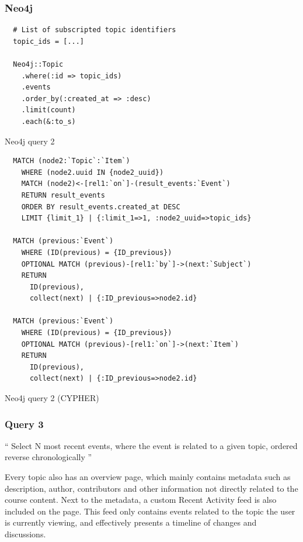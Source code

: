 \subsubsection*{Neo4j}

\begin{listing}[H]
  \begin{verbatim}
  # List of subscripted topic identifiers
  topic_ids = [...]

  Neo4j::Topic
    .where(:id => topic_ids)
    .events
    .order_by(:created_at => :desc)
    .limit(count)
    .each(&:to_s)
  \end{verbatim}

  \caption{Neo4j query 2}
  \label{lst:neo4j-query-2}
\end{listing}

\begin{listing}[H]
  \begin{verbatim}
  MATCH (node2:`Topic`:`Item`)
    WHERE (node2.uuid IN {node2_uuid})
    MATCH (node2)<-[rel1:`on`]-(result_events:`Event`)
    RETURN result_events
    ORDER BY result_events.created_at DESC
    LIMIT {limit_1} | {:limit_1=>1, :node2_uuid=>topic_ids}

  MATCH (previous:`Event`)
    WHERE (ID(previous) = {ID_previous})
    OPTIONAL MATCH (previous)-[rel1:`by`]->(next:`Subject`)
    RETURN
      ID(previous),
      collect(next) | {:ID_previous=>node2.id}

  MATCH (previous:`Event`)
    WHERE (ID(previous) = {ID_previous})
    OPTIONAL MATCH (previous)-[rel1:`on`]->(next:`Item`)
    RETURN
      ID(previous),
      collect(next) | {:ID_previous=>node2.id}
  \end{verbatim}

  \caption{Neo4j query 2 (CYPHER)}
  \label{lst:neo4j-query-2-cypher}
\end{listing}

\subsubsection{Query 3}
\label{subsubsec:query-3}

``
Select N most recent events, where the event is related to a given topic, ordered reverse chronologically
''

Every topic also has an overview page, which mainly contains metadata such as description, author, contributors and other information not directly related to the course content.
Next to the metadata, a custom Recent Activity feed is also included on the page.
This feed only contains events related to the topic the user is currently viewing, and effectively presents a timeline of changes and discussions.


